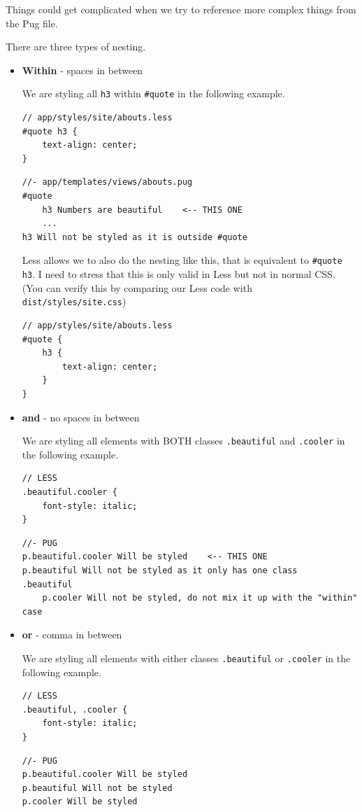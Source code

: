 Things could get complicated when we try to reference more complex things from the Pug file.

There are three types of nesting. 

\begin{itemize}
\item \textbf{Within} - spaces in between

We are styling all \texttt{h3} within \texttt{\#quote} in the following example.
    
\begin{lstlisting}[language=pug]
// app/styles/site/abouts.less
#quote h3 {
    text-align: center;
}
\end{lstlisting}
    
\begin{lstlisting}[language=pug]
//- app/templates/views/abouts.pug
#quote 
    h3 Numbers are beautiful    <-- THIS ONE
    ...
h3 Will not be styled as it is outside #quote
\end{lstlisting}

Less allows we to also do the nesting like this, that is equivalent to \texttt{\#quote h3}. I need to stress that this is only valid in Less but not in normal CSS. (You can verify this by comparing our Less code with \texttt{dist/styles/site.css})

\begin{lstlisting}[language=pug]
// app/styles/site/abouts.less
#quote {
    h3 {
        text-align: center;
    }
}
\end{lstlisting}

\item \textbf{and} - no spaces in between

We are styling all elements with BOTH classes \texttt{.beautiful} and \texttt{.cooler} in the following example.
    
\begin{lstlisting}[language=pug]
// LESS
.beautiful.cooler {
    font-style: italic;
}
\end{lstlisting}

\begin{lstlisting}[language=pug]
//- PUG
p.beautiful.cooler Will be styled    <-- THIS ONE
p.beautiful Will not be styled as it only has one class
.beautiful
    p.cooler Will not be styled, do not mix it up with the "within" case
\end{lstlisting}

\item \textbf{or} - comma in between

We are styling all elements with either classes \texttt{.beautiful} or \texttt{.cooler} in the following example.
    
\begin{lstlisting}[language=pug]
// LESS
.beautiful, .cooler {
    font-style: italic;
}
\end{lstlisting}

\begin{lstlisting}[language=pug]
//- PUG
p.beautiful.cooler Will be styled 
p.beautiful Will not be styled 
p.cooler Will be styled
\end{lstlisting}

\end{itemize}

